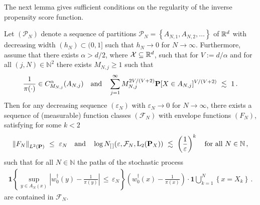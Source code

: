 The next lemma gives sufficient conditions on the regularity of the inverse propensity score function.
\begin{lemma}
  \label{lem:br_n_st}
  Let $(\mathcal{P}_N)$ denote a sequence of partitions
  $\mathcal{P}_N=\left\{ A_{N,1},A_{N,2},\ldots \right\}$ 
  of $\mathbb{R}^d$ 
  with decreasing width $(h_N)\subset(0,1]$ such that $h_N\to 0$ for $N\to\infty$.
  Furthermore, assume that there exists
  $\alpha>d/2$, where $\mathcal{X}\subseteq \mathbb{R}^d$, such
  that for 
  $V:=d/\alpha$
 and for all 
$
(j,N)\in\mathbb{N}^2
$
there exists 
$M_{N,j}\ge 1$ such that 
\begin{gather}
  \label{0897}
  \frac{1}{\pi(\cdot)}
  \in C^\alpha_{M_{N,j}}(A_{N,j})
  \quad
  \text{and}
  \quad
  \sum_{j=1}^{\infty} 
  M_{N,j}^{2V/(V+2)}
  \P
  [
  X\in A_{N,j}
  ]^{V/(V+2)}
  \ 
  \lesssim
  \ 
  1
  \,.
\end{gather}
Then for any decreasing sequence
  $(\varepsilon_N)$ with $\varepsilon_N\to 0$ for $N\to\infty$,
there exists a sequence of (measurable) function classes
$(\mathcal{F}_N)$
with envelope functions
$(F_N)$,
satisfying 
for some $k<2$
\begin{gather*}
\norm{F_N}_{L^2(\P)}
\ 
\le
\ 
\varepsilon_N
\quad
\text{and}
\quad
  \log
  N_{[\,]}(\varepsilon,\mathcal{F}_N,\mathrm{L}_2(\P_{X}))
  \ 
  \lesssim
  \ 
  \left( 
  \frac{1}{\varepsilon}
  \right)^k
  \quad
  \text{for all}
  \ 
  N\in\mathbb{N}
  \,,
\end{gather*}
such that
for all $N\in\mathbb{N}$ the paths of the stochastic process
\begin{gather}
  \label{error_process}
  \mathbf{1}{
    \left\{ 
      \sup_{y\in A_N(x)}
      \left| 
      w_0^\dagger(y)
      -
      \frac{1}{\pi(y)}
      \right|
      \,
      \le
      \,
      \varepsilon_N
    \right\}
  }
  \left( 
    w_0^\dagger(x)
      -
      \frac{1}{\pi(x)}
  \right)
  \cdot
  \mathbf{1}
  \bigcup_{k=1}^N
  \left\{ x=X_k \right\}
  \,.
\end{gather}
are contained in $\mathcal{F}_N$.
\end{lemma}
